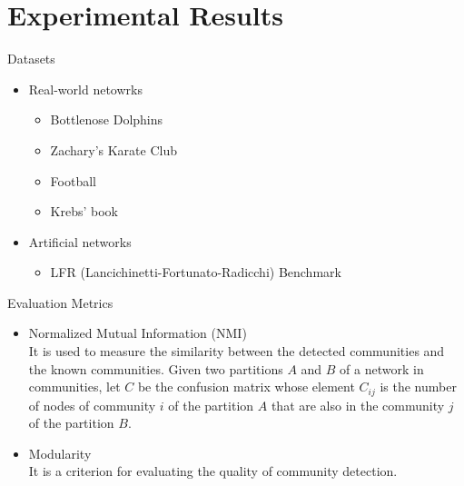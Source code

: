 \documentclass[aspectratio=169,xcolor=dvipsnames]{beamer}
\begin{document}
\section{Experimental Results}

\begin{frame}{Datasets}
    \begin{itemize}
        \item Real-world netowrks\\
        \begin{itemize}
            \item Bottlenose Dolphins
            \item Zachary's Karate Club
            \item Football
            \item Krebs' book
        \end{itemize}
        \item Artificial networks \\
        \begin{itemize}
            \item LFR (Lancichinetti-Fortunato-Radicchi) Benchmark
        \end{itemize}
    \end{itemize}
\end{frame}


\begin{frame}{Evaluation Metrics}
    \begin{itemize}
        \item Normalized Mutual Information (NMI) \\
        It is used to measure the similarity between the detected communities and the known communities. Given two partitions $A$ and $B$ of a network in communities, let $C$ be the confusion matrix whose element $C_{ij}$ is the number of nodes of community $i$ of the partition $A$ that are also in the community $j$ of the partition $B$.
        \item Modularity \\
        It is a criterion for evaluating the quality of community detection.
    \end{itemize}
\end{frame}

\end{document}
